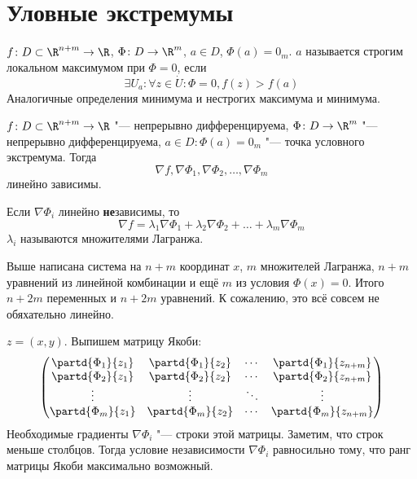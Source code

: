\section{Уловные экстремумы}

\begin{Def}
	$f\colon D \subset \R^{n+m} \to \R$, $\Phi\colon D \to \R^m$, $a \in D$, $\Phi(a) = 0_m$.
	$a$ называется строгим локальном максимумом при $\Phi = 0$, если
	\[ \exists U_a\colon \forall z \in \dot U\colon \Phi = 0, f(z) > f(a) \]
	Аналогичные определения минимума и нестрогих максимума и минимума.
\end{Def}

\begin{theorem}
	$f\colon D \subset \R^{n+m} \to \R$ "--- непрерывно дифференцируема,
	$\Phi\colon D \to \R^m$ "--- непрерывно дифференцируема,
	$a \in D\colon \Phi(a) = 0_m$ "--- точка условного экстремума.
	Тогда
	\[ \nabla f, \nabla \Phi_1, \nabla \Phi_2, \dots, \nabla \Phi_m \]
	линейно зависимы.
\end{theorem}
\begin{Def}
	Если $\nabla \Phi_i$ линейно \textbf{не}зависимы, то
	\[ \nabla f = \lambda_1 \nabla \Phi_1 + \lambda_2 \nabla \Phi_2 + \dots + \lambda_m \nabla \Phi_m \]
	$\lambda_i$ называются множителями Лагранжа.
\end{Def}
\begin{Rem}
	Выше написана система на $n + m$ координат $x$, $m$ множителей Лагранжа,
	$n + m$ уравнений из линейной комбинации и ещё $m$ из условия $\Phi(x) = 0$.
	Итого $n + 2m$ переменных и $n + 2m$ уравнений.
	К сожалению, это всё совсем не обяхательно линейно.
\end{Rem}
\begin{Rem}
	$z = (x, y)$. Выпишем матрицу Якоби:
	\[
		\begin{pmatrix}
			\partd{\Phi_1}{z_1} & \partd{\Phi_1}{z_2} & \cdots & \partd{\Phi_1}{z_{n+m}} \\
			\partd{\Phi_2}{z_1} & \partd{\Phi_2}{z_2} & \cdots & \partd{\Phi_2}{z_{n+m}} \\
			\vdots & \vdots & \ddots & \vdots \\
			\partd{\Phi_m}{z_1} & \partd{\Phi_m}{z_2} & \cdots & \partd{\Phi_m}{z_{n+m}} \\
		\end{pmatrix}
	\]
	Необходимые градиенты $\nabla \Phi_i$ "--- строки этой матрицы.
	Заметим, что строк меньше столбцов.
	Тогда условие независимости $\nabla \Phi_i$ равносильно тому, что ранг матрицы Якоби максимально возможный.
\end{Rem}
